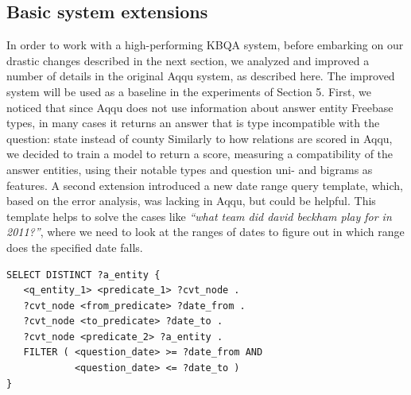 \subsection{Basic system extensions}
In order to work with a high-performing KBQA system, before embarking on our drastic changes described in the next section, we analyzed and improved a number of details in the original Aqqu system, as described here. The improved system will be used as a baseline in the experiments of Section 5. 
First, we noticed that since Aqqu does not use information about answer entity Freebase types, in many cases it returns an answer that is type incompatible with the question: \eg state instead of county \etc
Similarly to how relations are scored in Aqqu, we decided to train a model to return a score, measuring a compatibility of the answer entities, using their notable types and question uni- and bigrams as features.
A second extension introduced a new date range query template, which, based on the error analysis, was lacking in Aqqu, but could be helpful. This template helps to solve the cases like \textit{``what team did david beckham play for in 2011?''}, where we need to look at the ranges of dates to figure out in which range does the specified date falls.

\vspace{-0.1cm}
\begin{lstlisting}[frame=single,basicstyle=\small]
SELECT DISTINCT ?a_entity {
   <q_entity_1> <predicate_1> ?cvt_node .
   ?cvt_node <from_predicate> ?date_from .
   ?cvt_node <to_predicate> ?date_to .
   ?cvt_node <predicate_2> ?a_entity .
   FILTER ( <question_date> >= ?date_from AND
            <question_date> <= ?date_to )
}
\end{lstlisting}
\vspace{-0.3cm}



